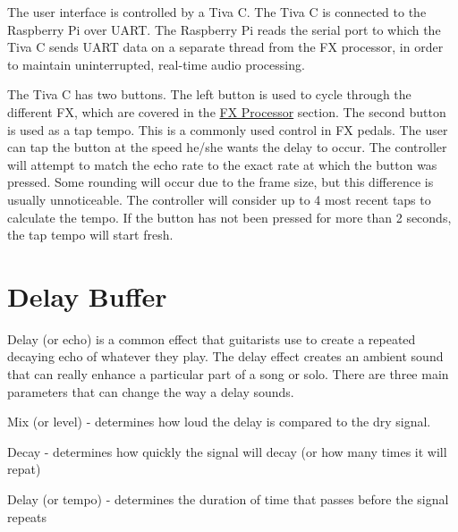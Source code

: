 The user interface is controlled by a Tiva C. The Tiva C is connected to the Raspberry Pi over U\+A\+R\+T. The Raspberry Pi reads the serial port to which the Tiva C sends U\+A\+R\+T data on a separate thread from the F\+X processor, in order to maintain uninterrupted, real-\/time audio processing.

The Tiva C has two buttons. The left button is used to cycle through the different F\+X, which are covered in the \hyperlink{index_fx}{F\+X Processor} section. The second button is used as a tap tempo. This is a commonly used control in F\+X pedals. The user can tap the button at the speed he/she wants the delay to occur. The controller will attempt to match the echo rate to the exact rate at which the button was pressed. Some rounding will occur due to the frame size, but this difference is usually unnoticeable. The controller will consider up to 4 most recent taps to calculate the tempo. If the button has not been pressed for more than 2 seconds, the tap tempo will start fresh.\hypertarget{index_delay}{}\section{Delay Buffer}\label{index_delay}
Delay (or echo) is a common effect that guitarists use to create a repeated decaying echo of whatever they play. The delay effect creates an ambient sound that can really enhance a particular part of a song or solo. There are three main parameters that can change the way a delay sounds.


\begin{DoxyItemize}
\item Mix (or level) -\/ determines how loud the delay is compared to the dry signal.
\item Decay -\/ determines how quickly the signal will decay (or how many times it will repat)
\item Delay (or tempo) -\/ determines the duration of time that passes before the signal repeats
\end{DoxyItemize}

